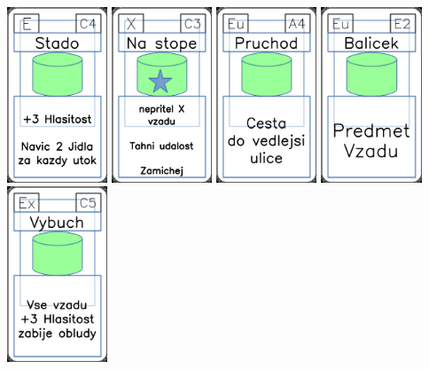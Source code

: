 \documentclass[a4paper]{article}
\begin{document}
	\includegraphics[width=3.0cm]{img-4_43}
	\includegraphics[width=3.0cm]{img-5_12}
	\includegraphics[width=3.0cm]{img-4_33}
	\includegraphics[width=3.0cm]{img-4_21}
	\includegraphics[width=3.0cm]{img-4_14}
\end{document}
